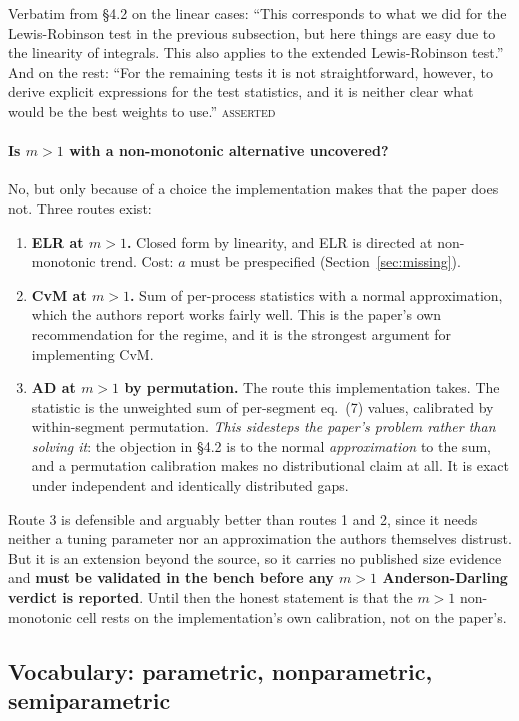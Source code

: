 \documentclass[11pt,a4paper]{article}
\newcommand{\ASSERTED}{\textsc{\textcolor{purple!70!black}{asserted}}}
\begin{document}
\medskip
\noindent
Verbatim from \S 4.2 on the linear cases: \enquote{This corresponds to what we did for the
Lewis-Robinson test in the previous subsection, but here things are easy due to the
linearity of integrals. This also applies to the extended Lewis-Robinson test.} And on
the rest: \enquote{For the remaining tests it is not straightforward, however, to derive
explicit expressions for the test statistics, and it is neither clear what would be the
best weights to use.} \ASSERTED

\paragraph{Is $m>1$ with a non-monotonic alternative uncovered?} No, but only because of
a choice the implementation makes that the paper does not. Three routes exist:

\begin{enumerate}[leftmargin=1.6em,itemsep=3pt]
\item \textbf{ELR at $m>1$.} Closed form by linearity, and ELR is directed at
non-monotonic trend. Cost: $a$ must be prespecified (Section~\ref{sec:missing}).
\item \textbf{CvM at $m>1$.} Sum of per-process statistics with a normal approximation,
which the authors report works fairly well. This is the paper's own recommendation for
the regime, and it is the strongest argument for implementing CvM.
\item \textbf{AD at $m>1$ by permutation.} The route this implementation takes. The
statistic is the unweighted sum of per-segment eq.~(7) values, calibrated by
within-segment permutation. \emph{This sidesteps the paper's problem rather than solving
it}: the objection in \S 4.2 is to the normal \emph{approximation} to the sum, and a
permutation calibration makes no distributional claim at all. It is exact under
independent and identically distributed gaps.
\end{enumerate}

\noindent
Route 3 is defensible and arguably better than routes 1 and 2, since it needs neither a
tuning parameter nor an approximation the authors themselves distrust. But it is an
extension beyond the source, so it carries no published size evidence and \textbf{must be
validated in the bench before any $m>1$ Anderson-Darling verdict is reported}. Until then
the honest statement is that the $m>1$ non-monotonic cell rests on the implementation's
own calibration, not on the paper's.

\subsection{Vocabulary: parametric, nonparametric, semiparametric}
\label{sec:semiparametric}
\end{document}
